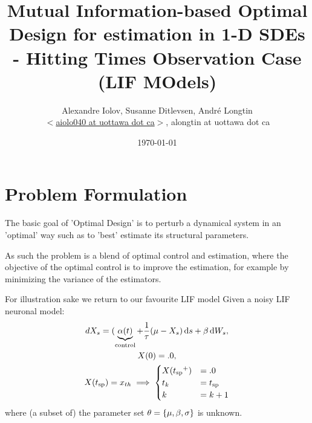 \documentclass{article}
\begin{document}
\title{Mutual Information-based Optimal Design for estimation in 1-D SDEs -
Hitting Times Observation Case (LIF MOdels)} 
\author{Alexandre Iolov, Susanne Ditlevsen, Andr\'e Longtin  \\
$<$\href{mailto:aiolo040@uottawa.ca}
		{aiolo040 at uottawa dot ca}$>$, alongtin at uottawa dot ca}

\date{\today}

\maketitle  

 
\tableofcontents

\listoftables  


\section{Problem Formulation}

The basic goal of 'Optimal Design' is to perturb a dynamical system in an
'optimal' way such as to 'best' estimate its structural parameters. 

As such the problem is a blend of optimal control and estimation, where the
objective of the optimal control is to improve the estimation, for example by
minimizing the variance of the estimators. 

For illustration sake we return to our favourite LIF model
Given a noisy LIF neuronal model:
\begin{equation}
\begin{gathered}
dX_s = (\underbrace{\a(t)}_{\textrm{control}} + \frac 1\tc(\m %
 - {X_s} ) \intd{s} + \b\intd{W_s},
\\
X(0) = .0,
\\
X(\ts) = \xth \implies  
\begin{cases}
X(\ts^+) &= .0   
\\
t_k &=  \ts
\\
k  &= k+1
\end{cases}
\end{gathered}
\label{eq:X_evolution_uo}
\end{equation}
where (a subset of) the parameter set ${\theta} = \{{\mu }, {\beta}, {\sigma }\}$ is unknown.
\end{document}
